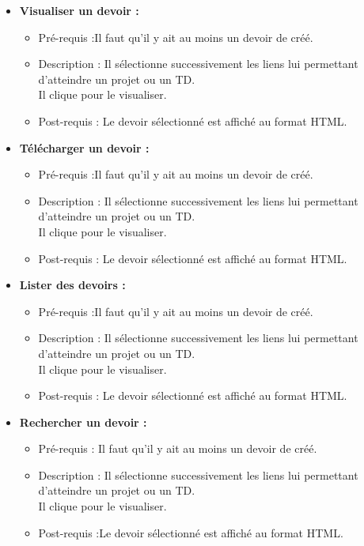 \begin{itemize}
\item {\bf Visualiser un devoir :}
	\begin{itemize}
	\item Pr{\'e}-requis :Il faut qu'il y ait au moins un devoir de cr{\'e}{\'e}.
	\item Description : Il s{\'e}lectionne successivement les liens lui permettant d'atteindre un projet ou un TD.\\
	Il clique pour le visualiser.
	\item Post-requis : Le devoir s{\'e}lectionn{\'e} est affich{\'e} au format HTML.
	\end{itemize}
		
\item {\bf T{\'e}l{\'e}charger un devoir :}
	\begin{itemize}
	\item Pr{\'e}-requis :Il faut qu'il y ait au moins un devoir de cr{\'e}{\'e}.
	\item Description : Il s{\'e}lectionne successivement les liens lui permettant d'atteindre un projet ou un TD.\\
	Il clique pour le visualiser.
	\item Post-requis : Le devoir s{\'e}lectionn{\'e} est affich{\'e} au format HTML.
	\end{itemize}

\item {\bf Lister des devoirs :}
	\begin{itemize}
	\item Pr{\'e}-requis :Il faut qu'il y ait au moins un devoir de cr{\'e}{\'e}.
	\item Description : Il s{\'e}lectionne successivement les liens lui permettant d'atteindre un projet ou un TD.\\
	Il clique pour le visualiser.
	\item Post-requis : Le devoir s{\'e}lectionn{\'e} est affich{\'e} au format HTML.
	\end{itemize}
			
\item {\bf Rechercher un devoir :}
	\begin{itemize}
	\item Pr{\'e}-requis : Il faut qu'il y ait au moins un devoir de cr{\'e}{\'e}.
	\item Description : Il s{\'e}lectionne successivement les liens lui permettant d'atteindre un projet ou un TD.\\
	Il clique pour le visualiser.
	\item Post-requis :Le devoir s{\'e}lectionn{\'e} est affich{\'e} au format HTML.
	\end{itemize}
\end{itemize}


